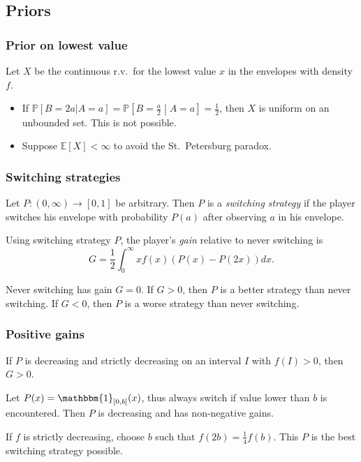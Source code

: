 \documentclass{beamer}
\theoremstyle{plain}
\theoremstyle{definition}
\theoremstyle{remark}
\renewcommand{\P}{\mathbb{P}}
\newcommand{\E}{\mathbb{E}}
\newcommand{\1}{\mathbbm{1}}
\begin{document}
\subsection*{Priors}
\begin{frame}
\frametitle{Prior on lowest value}
Let $X$ be the continuous r.v.~for the lowest value $x$ in the envelopes with density $f$.
\begin{itemize}
	\item If $\P[B=2a|A=a]=\P\left[B=\frac{a}{2}\middle|A=a\right]=\frac{1}{2}$, then $X$ is uniform on an unbounded set. This is not possible.
	\item Suppose $\E[X]<\infty$ to avoid the St.~Petersburg paradox.
\end{itemize}
\end{frame}

\begin{frame}
\frametitle{Switching strategies}
\begin{definition}
Let $P\colon(0,\infty)\to[0,1]$ be arbitrary. Then $P$ is a \emph{switching strategy} if the player switches his envelope with probability $P(a)$ after observing $a$ in his envelope.
\end{definition}\pause
\begin{definition}[Gain]
Using switching strategy $P$, the player's \emph{gain} relative to never switching is
\[G=\frac{1}{2}\int_0^\infty xf(x)(P(x)-P(2x))dx.\]
\end{definition}\pause
Never switching has gain $G=0$. If $G>0$, then $P$ is a better strategy than never switching. If $G<0$, then $P$ is a worse strategy than never switching.
\end{frame}
\begin{frame}
\frametitle{Positive gains}
\begin{lemma}
If $P$ is decreasing and strictly decreasing on an interval $I$ with $f(I)>0$, then $G>0$.
\end{lemma}\pause
\begin{example}
Let $P(x)=\1_{[0,b]}(x)$, thus always switch if value lower than $b$ is encountered. Then $P$ is decreasing and has non-negative gains.

If $f$ is strictly decreasing, choose $b$ such that $f(2b)=\frac{1}{4}f(b)$. This $P$ is the best switching strategy possible.
\end{example}
\end{frame}
\end{document}
